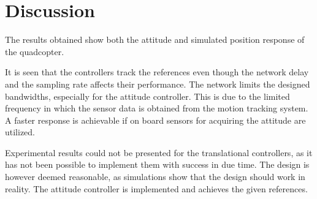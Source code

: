 \section{Discussion}\label{sec:discussion}

The results obtained show both the attitude and simulated position response of the quadcopter. 

It is seen that the controllers track the references even though the network delay and the sampling rate affects their performance. The network limits the designed bandwidths, especially for the attitude controller. This is due to the limited frequency in which the sensor data is obtained from the motion tracking system. A faster response is achievable if on board sensors for acquiring the attitude are utilized.

Experimental results could not be presented for the translational controllers, as it has not been possible to implement them with success in due time. The design is however deemed reasonable, as simulations show that the design should work in reality. The attitude controller is implemented and achieves the given references.

%
